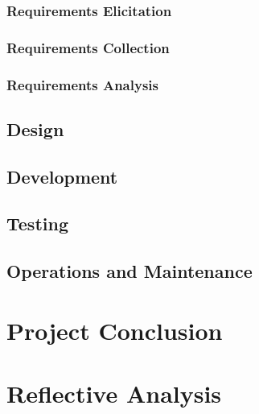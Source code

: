 \documentclass[11pt,a4paper]{report}
\begin{document}
\subsection{Requirements Elicitation}

\subsection{Requirements Collection}

\subsection{Requirements Analysis}

\section{Design}

\section{Development}

\section{Testing}

\section{Operations and Maintenance}

\chapter{Project Conclusion}

\chapter{Reflective Analysis}

\renewcommand\bibname{References}

\end{document}
